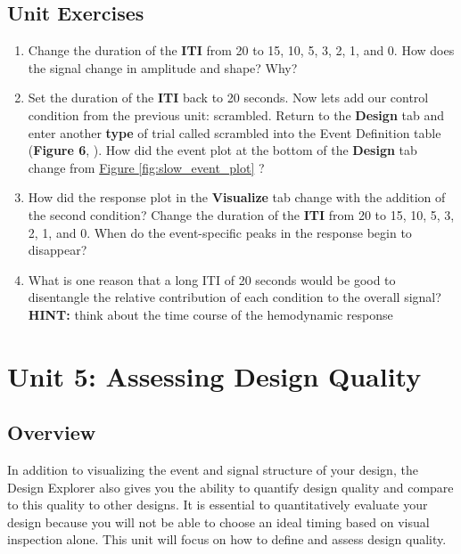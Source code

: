 \documentclass[10pt]{article}
\newcommand*\circled[1]{\tikz[baseline=(char.base)]{
            \node[shape=circle,draw,inner sep=.5pt] (char) {#1};}}
\begin{document}
	\subsection{Unit Exercises}
	\label{subsec:u4exercises}
		\begin{enumerate}
			\item Change the duration of the \textbf{ITI} from 20 to 15, 10, 5, 3, 2, 1, and 0. How does the signal change in amplitude and shape? Why?
			\item Set the duration of the \textbf{ITI} back to 20 seconds.
			Now lets add our control condition from the previous unit: scrambled.
			Return to the \textbf{Design} tab and enter another \textbf{type} of trial called scrambled into the Event Definition table (\textbf{Figure 6}, \circled{1}).
			How did the event plot at the bottom of the \textbf{Design} tab change from \hyperref[fig:slow_event_plot]{Figure \ref{fig:slow_event_plot}} ?
			\item How did the response plot in the \textbf{Visualize} tab change with the addition of the second condition? 
			Change the duration of the \textbf{ITI} from 20 to 15, 10, 5, 3, 2, 1, and 0. 
			When do the event-specific peaks in the response begin to disappear?
			\item What is one reason that a long ITI of 20 seconds would be good to disentangle the relative contribution of each condition to the overall signal? \textbf{HINT:} think about the time course of the hemodynamic response
		\end{enumerate}
\newpage


\section{Unit 5: Assessing Design Quality}
\label{sec:unit5}
	\subsection{Overview}
	\label{subsec:u5overview}
		In addition to visualizing the event and signal structure of your design, the Design Explorer also gives you the ability to quantify design quality and compare to this quality to other designs.
		It is essential to quantitatively evaluate your design because you will not be able to choose an ideal timing based on visual inspection alone.
		This unit will focus on how to define and assess design quality.
\end{document}
